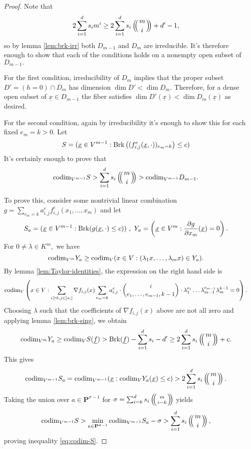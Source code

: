 \documentclass[12pt]{amsart}
\let\ul\underline
\theoremstyle{definition}
\def\multiset#1#2{\ensuremath{\left(\kern-.3em\left(\genfrac{}{}{0pt}{}{#1}{#2}\right)\kern-.3em\right)}}
\renewcommand{\P}{\mathbf{P}}
\newcommand{\codim}{\textnormal{codim}}
\newcommand{\brk}{\textnormal{Brk}}
\let\ul\underline
\begin{document}
\begin{proof}
    Note that 
    \[
    2\sum_{i=1}^d s_i m^i \ge 2\sum_{i=1}^d s_i\multiset{m}{i} + d'-1,
    \]
    so by lemma \ref{lem:brk-irr} both $D_{m-1}$ and $D_m$ are irreducible. It's therefore enough to show that each of the conditions holds on a nonempty open subset of $D_{m-1}.$
    
    For the first condition, irreducibility of $D_m$ implies that the proper subset $D' = (h = 0)\cap D_m$ has dimension $\dim D' < \dim D_m.$ Therefore, for a dense open subset of $\ul{x}\in D_{m-1}$ the fiber satisfies $\dim D'(\ul{x}) <\dim D_m(\ul{x})$ as desired. 
    
    For the second condition, again by irreducibility it's enough to show this for each fixed $e_m = k>0.$ Let 
    \[
    S = (\ul{x}\in V^{m-1}: \brk \left((f_{i,j}^e(\ul{x},\cdot))_{e_m = k} \right) \le c)
    \]
    It's certainly enough to prove that
    \begin{equation}\label{eq:codim-S}
        \codim_{V^{m-1}} S > \sum_{i=1}^d s_i \multiset{m}{i} > \codim_{V^{m-1}} D_{m-1}.
    \end{equation}
    
    To prove this, consider some nontrivial linear combination $g = \sum_{e_m = k} a_{i,j}^e f_{i,j}^e(x_1,\ldots,x_m)$ and let
    $$S_a = (\ul{x}\in V^{m-1}: \brk(g(\ul{x},\cdot) \le c))\ ,\ Y_a = \left( \ul{x}\in V^m : \frac{\partial g}{\partial x_m} (\ul{x}) = 0 \right).$$
    For $ 0 \neq \lambda\in K^m,$ we have
    \[
    \codim_{V^m} Y_a \ge \codim_V (x\in V:(\lambda_1x,\ldots,\lambda_m x) \in Y_a). 
    \]
    By lemma \ref{lem:Taylor-identities}, the expression on the right hand side is
    \[
    \codim_V \left( x\in V:  \sum_{i\ge k,j\in [s_i]} \nabla f_{i,j}(x) \sum_{e_m = k} a_{i,j}^e \cdot \binom{i}{e_1,\ldots,e_{m-1},k-1} \cdot \lambda_1^{e_1}\ldots \lambda_{m-1}^{e_{m-1}} \lambda_m^{k-1}  = 0 \right).
    \]
    Choosing $\lambda$ such that the coefficients of  $\nabla f_{i,j}(x)$ above are not all zero and applying lemma \ref{lem:brk-sing}, we obtain  
    \[
    \codim_{V^m} Y_a \ge \codim_V S(\ul{f}) > \brk(\ul{f}) -\sum_{i=1}^d s_i-d' \ge 2\sum_{i=1}^d s_i\multiset{m}{i} +c .
    \]
    This gives  
    \[
    \codim_{V^{m-1}} S_a = \codim_{V^{m-1}} (\ul{x}: \codim_V Y_a(\ul{x}) \le c) > 2\sum_{i=1}^d s_i \multiset{m}{i}.
    \]
    Taking the union over $a\in \P^{\sigma-1}$ for
    $\sigma = \sum_{i=k}^d s_i \multiset{m}{i-k}$ yields 
    \[
    \codim_{V^{m-1}} S > \min_{a\in \P^{\sigma-1}} \codim_{V^{m-1}} S_a - \sigma >  \sum_{i=1}^d s_i \multiset{m}{i},  
    \]
    proving inequality \eqref{eq:codim-S}.
\end{proof}
\end{document}
